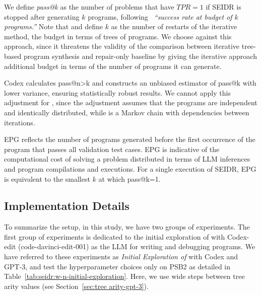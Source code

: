 We define \emph{pass@k} as the number of problems that have $TPR=1$ if SEIDR is stopped after generating $k$ programs, following~\citet{kulal2019:spoc} \emph{``success rate at budget of $k$ programs.''}
Note that \citet{jiang2023:selfevolve} and \citet{chen2023:teaching} define $k$ as the number of restarts of the iterative method, the budget in terms of trees of programs.
We choose against this approach, since it threatens the validity of the comparison between iterative tree-based program synthesis and repair-only baseline by giving the iterative approach additional budget in terms of the number of programs it can generate.

Codex \cite{chen2021:evaluating} calculates pass@n>k and constructs an unbiased estimator of pass@k with lower variance, ensuring statistically robust results.
We cannot apply this adjustment for \method{}, since the adjustment assumes that the programs are independent and identically distributed, while \method{} is a Markov chain with dependencies between iterations. 

EPG reflects the number of programs generated before the first occurrence of the program that passes all validation test cases.
EPG is indicative of the computational cost of solving a problem distributed in terms of LLM inferences and program compilations and executions.
For a single execution of SEIDR, EPG is equivalent to the smallest $k$ at which pass@k=1.

\subsection{Implementation Details}
\label{sec:implementation}


To summarize the setup, in this study, we have two groups of experiments. 
% 
The first group of experiments is dedicated to the initial exploration of \rqtreearity{}
with Codex-edit (code-davinci-edit-001) as the LLM for writing and debugging programs. 
We have referred to these experiments as \emph{Initial Exploration of \method{}} with Codex and GPT-3, and test the hyperparameter choices only on PSB2 as detailed in Table~\ref{tab:seidr:w-n-initial-exploration}.
Here, we use wide steps between tree arity values (see Section~\ref{sec:tree arity-gpt-3}).
 
